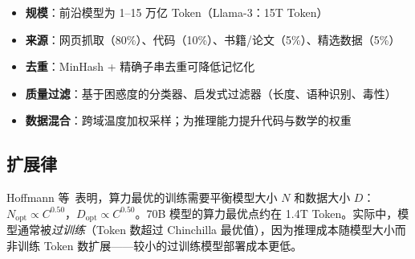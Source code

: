 \begin{keybox}[预训练数据配方]
\begin{itemize}
  \item \textbf{规模}：前沿模型为 1--15 万亿 Token（Llama-3：15T Token）
  \item \textbf{来源}：网页抓取（80\%）、代码（10\%）、书籍/论文（5\%）、精选数据（5\%）
  \item \textbf{去重}：MinHash + 精确子串去重可降低记忆化~\cite{lee2022deduplicating}
  \item \textbf{质量过滤}：基于困惑度的分类器、启发式过滤器（长度、语种识别、毒性）
  \item \textbf{数据混合}：跨域温度加权采样；为推理能力提升代码与数学的权重
\end{itemize}
\end{keybox}

\subsection{扩展律}
\label{scaling-laws}

Hoffmann 等~\cite{hoffmann2022chinchilla}表明，算力最优的训练需要平衡模型大小 $N$ 和数据大小 $D$：$N_\text{opt} \propto C^{0.50}$，$D_\text{opt} \propto C^{0.50}$。70B 模型的算力最优点约在 1.4T Token。实际中，模型通常被\emph{过训练}（Token 数超过 Chinchilla 最优值），因为推理成本随模型大小而非训练 Token 数扩展——较小的过训练模型部署成本更低。

